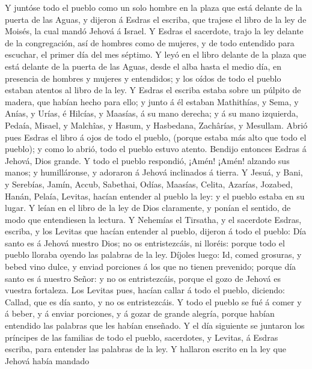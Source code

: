  Y juntóse todo el pueblo como un solo hombre en la plaza
que está delante de la puerta de las Aguas, y dijeron á Esdras el
escriba, que trajese el libro de la ley de Moisés, la cual mandó Jehová
á Israel.  Y Esdras el sacerdote, trajo la ley delante de
la congregación, así de hombres como de mujeres, y de todo entendido
para escuchar, el primer día del mes séptimo.  Y leyó en
el libro delante de la plaza que está delante de la puerta de las Aguas,
desde el alba hasta el medio día, en presencia de hombres y mujeres y
entendidos; y los oídos de todo el pueblo estaban atentos al libro de la
ley.  Y Esdras el escriba estaba sobre un púlpito de
madera, que habían hecho para ello; y junto á él estaban Mathithías, y
Sema, y Anías, y Urías, é Hilcías, y Maasías, á su mano derecha; y á su
mano izquierda, Pedaía, Misael, y Malchîas, y Hasum, y Hasbedana,
Zachârías, y Mesullam.  Abrió pues Esdras el libro á ojos
de todo el pueblo, (porque estaba más alto que todo el pueblo); y como
lo abrió, todo el pueblo estuvo atento.  Bendijo entonces
Esdras á Jehová, Dios grande. Y todo el pueblo respondió, ¡Amén! ¡Amén!
alzando sus manos; y humilláronse, y adoraron á Jehová inclinados á
tierra.  Y Jesuá, y Bani, y Serebías, Jamín, Accub,
Sabethai, Odías, Maasías, Celita, Azarías, Jozabed, Hanán, Pelaía,
Levitas, hacían entender al pueblo la ley: y el pueblo estaba en su
lugar.  Y leían en el libro de la ley de Dios claramente,
y ponían el sentido, de modo que entendiesen la lectura. 
Y Nehemías el Tirsatha, y el sacerdote Esdras, escriba, y los Levitas
que hacían entender al pueblo, dijeron á todo el pueblo: Día santo es á
Jehová nuestro Dios; no os entristezcáis, ni lloréis: porque todo el
pueblo lloraba oyendo las palabras de la ley.  Díjoles
luego: Id, comed grosuras, y bebed vino dulce, y enviad porciones á los
que no tienen prevenido; porque día santo es á nuestro Señor: y no os
entristezcáis, porque el gozo de Jehová es vuestra fortaleza.
 Los Levitas pues, hacían callar á todo el pueblo,
diciendo: Callad, que es día santo, y no os entristezcáis.
 Y todo el pueblo se fué á comer y á beber, y á enviar
porciones, y á gozar de grande alegría, porque habían entendido las
palabras que les habían enseñado.  Y el día siguiente se
juntaron los príncipes de las familias de todo el pueblo, sacerdotes, y
Levitas, á Esdras escriba, para entender las palabras de la ley.
 Y hallaron escrito en la ley que Jehová había mandado
